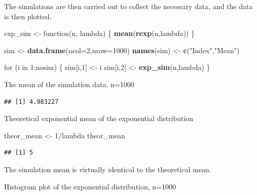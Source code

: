 \documentclass[]{article}
\newenvironment{Shaded}{\begin{snugshade}}{\end{snugshade}}
\newcommand{\KeywordTok}[1]{\textcolor[rgb]{0.13,0.29,0.53}{\textbf{{#1}}}}
\newcommand{\DataTypeTok}[1]{\textcolor[rgb]{0.13,0.29,0.53}{{#1}}}
\newcommand{\DecValTok}[1]{\textcolor[rgb]{0.00,0.00,0.81}{{#1}}}
\newcommand{\StringTok}[1]{\textcolor[rgb]{0.31,0.60,0.02}{{#1}}}
\newcommand{\NormalTok}[1]{{#1}}
\begin{document}
The simulations are then carried out to collect the necessary data, and
the data is then plotted.

\begin{Shaded}
\begin{Highlighting}[]
\NormalTok{exp_sim <-}\StringTok{ }\NormalTok{function(n, lambda) \{}
        \KeywordTok{mean}\NormalTok{(}\KeywordTok{rexp}\NormalTok{(n,lambda))}
\NormalTok{\}}

\NormalTok{sim <-}\StringTok{ }\KeywordTok{data.frame}\NormalTok{(}\DataTypeTok{ncol=}\DecValTok{2}\NormalTok{,}\DataTypeTok{nrow=}\DecValTok{1000}\NormalTok{)}
\KeywordTok{names}\NormalTok{(sim) <-}\StringTok{ }\KeywordTok{c}\NormalTok{(}\StringTok{"Index"}\NormalTok{,}\StringTok{"Mean"}\NormalTok{)}

\NormalTok{for (i in }\DecValTok{1}\NormalTok{:nosim) \{}
        \NormalTok{sim[i,}\DecValTok{1}\NormalTok{] <-}\StringTok{ }\NormalTok{i}
        \NormalTok{sim[i,}\DecValTok{2}\NormalTok{] <-}\StringTok{ }\KeywordTok{exp_sim}\NormalTok{(n,lambda)}
\NormalTok{\}}
\end{Highlighting}
\end{Shaded}

The mean of the simulation data, n=1000

\begin{Shaded}
\end{Shaded}

\begin{verbatim}
## [1] 4.983227
\end{verbatim}

Theoretical exponential mean of the exponential distribution

\begin{Shaded}
\begin{Highlighting}[]
\NormalTok{theor_mean <-}\StringTok{ }\DecValTok{1}\NormalTok{/lambda}
\NormalTok{theor_mean}
\end{Highlighting}
\end{Shaded}

\begin{verbatim}
## [1] 5
\end{verbatim}

The simulation mean is virtually identical to the theoretical mean.

Histogram plot of the exponential distribution, n=1000
\end{document}
